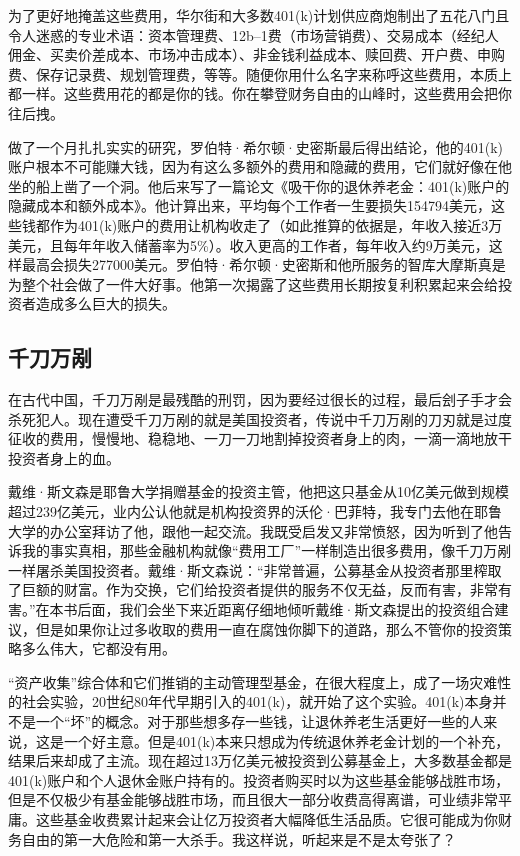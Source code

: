 为了更好地掩盖这些费用，华尔街和大多数401(k)计划供应商炮制出了五花八门且令人迷惑的专业术语：资本管理费、12b–1费（市场营销费）、交易成本（经纪人佣金、买卖价差成本、市场冲击成本）、非金钱利益成本、赎回费、开户费、申购费、保存记录费、规划管理费，等等。随便你用什么名字来称呼这些费用，本质上都一样。这些费用花的都是你的钱。你在攀登财务自由的山峰时，这些费用会把你往后拽。

做了一个月扎扎实实的研究，罗伯特·希尔顿·史密斯最后得出结论，他的401(k)账户根本不可能赚大钱，因为有这么多额外的费用和隐藏的费用，它们就好像在他坐的船上凿了一个洞。他后来写了一篇论文《吸干你的退休养老金：401(k)账户的隐藏成本和额外成本》。他计算出来，平均每个工作者一生要损失154794美元，这些钱都作为401(k)账户的费用让机构收走了（如此推算的依据是，年收入接近3万美元，且每年年收入储蓄率为5\%）。收入更高的工作者，每年收入约9万美元，这样最高会损失277000美元。罗伯特·希尔顿·史密斯和他所服务的智库大摩斯真是为整个社会做了一件大好事。他第一次揭露了这些费用长期按复利积累起来会给投资者造成多么巨大的损失。

\subsection{千刀万剐}

在古代中国，千刀万剐是最残酷的刑罚，因为要经过很长的过程，最后刽子手才会杀死犯人。现在遭受千刀万剐的就是美国投资者，传说中千刀万剐的刀刃就是过度征收的费用，慢慢地、稳稳地、一刀一刀地割掉投资者身上的肉，一滴一滴地放干投资者身上的血。

戴维·斯文森是耶鲁大学捐赠基金的投资主管，他把这只基金从10亿美元做到规模超过239亿美元，业内公认他就是机构投资界的沃伦·巴菲特，我专门去他在耶鲁大学的办公室拜访了他，跟他一起交流。我既受启发又非常愤怒，因为听到了他告诉我的事实真相，那些金融机构就像“费用工厂”一样制造出很多费用，像千刀万剐一样屠杀美国投资者。戴维·斯文森说：“非常普遍，公募基金从投资者那里榨取了巨额的财富。作为交换，它们给投资者提供的服务不仅无益，反而有害，非常有害。”在本书后面，我们会坐下来近距离仔细地倾听戴维·斯文森提出的投资组合建议，但是如果你让过多收取的费用一直在腐蚀你脚下的道路，那么不管你的投资策略多么伟大，它都没有用。

“资产收集”综合体和它们推销的主动管理型基金，在很大程度上，成了一场灾难性的社会实验，20世纪80年代早期引入的401(k)，就开始了这个实验。401(k)本身并不是一个“坏”的概念。对于那些想多存一些钱，让退休养老生活更好一些的人来说，这是一个好主意。但是401(k)本来只想成为传统退休养老金计划的一个补充，结果后来却成了主流。现在超过13万亿美元被投资到公募基金上，大多数基金都是401(k)账户和个人退休金账户持有的。投资者购买时以为这些基金能够战胜市场，但是不仅极少有基金能够战胜市场，而且很大一部分收费高得离谱，可业绩非常平庸。这些基金收费累计起来会让亿万投资者大幅降低生活品质。它很可能成为你财务自由的第一大危险和第一大杀手。我这样说，听起来是不是太夸张了？

